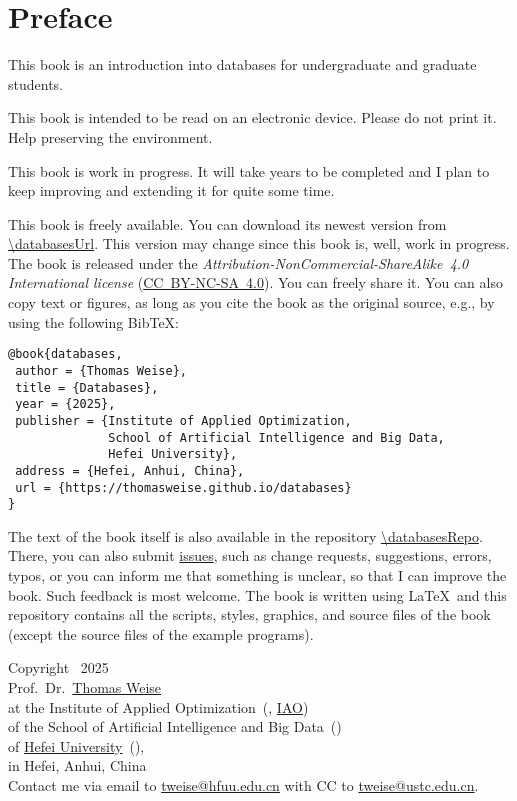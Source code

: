 \chapter*{Preface}%
%
%
This book is an introduction into databases for undergraduate and graduate students.

This book is intended to be read on an electronic device.
Please do not print it.
Help preserving the environment.

This book is work in progress.
It will take years to be completed and I plan to keep improving and extending it for quite some time.

This book is freely available.
You can download its newest version from \expandafter\url{\databasesUrl}.
This version may change since this book is, well, work in progress.
The book is released under the \emph{Attribution-NonCommercial-ShareAlike~4.0 International license} (\href{http://creativecommons.org/licenses/by-nc-sa/4.0/}{\mbox{CC~BY-NC-SA~4.0}}).
You can freely share it.
You can also copy text or figures, as long as you cite the book as the original source, e.g., by using the following Bib\TeX:%
%
\begin{lstlisting}[style=text_style]
@book{databases,
 author = {Thomas Weise},
 title = {Databases},
 year = {2025},
 publisher = {Institute of Applied Optimization,
              School of Artificial Intelligence and Big Data,
              Hefei University},
 address = {Hefei, Anhui, China},
 url = {https://thomasweise.github.io/databases}
}
\end{lstlisting}
%
%
\begin{sloppypar}%
The text of the book itself is also available in the repository \url{\databasesRepo}.
There, you can also submit \href{\databasesRepo/issues}{issues}, such as change requests, suggestions, errors, typos, or you can inform me that something is unclear, so that I can improve the book.
Such feedback is most welcome.
The book is written using \LaTeX\ and this repository contains all the scripts, styles, graphics, and source files of the book (except the source files of the example programs).%
\end{sloppypar}%
%
\strut\vfill\strut%
%
\begin{flushleft}%
Copyright \textcopyright\ 2025\\[3pt]%
Prof.~Dr.~\href{http://iao.hfuu.edu.cn/5}{Thomas Weise}~\\%
at the Institute of Applied Optimization~(, \href{http://iao.hfuu.edu.cn}{IAO})\\%
of the School of Artificial Intelligence and Big Data~(\href{http://www.hfuu.edu.cn/aibd}{})\\%
of \href{http://www.hfuu.edu.cn/english}{Hefei University}~(\href{http://www.hfuu.edu.cn}{}),\\%
in Hefei, Anhui, China~\\[6pt]%
Contact me via email to \href{mailto:tweise@hfuu.edu.cn}{tweise@hfuu.edu.cn} with CC to \href{mailto:tweise@ustc.edu.cn}{tweise@ustc.edu.cn}.%
\end{flushleft}%
